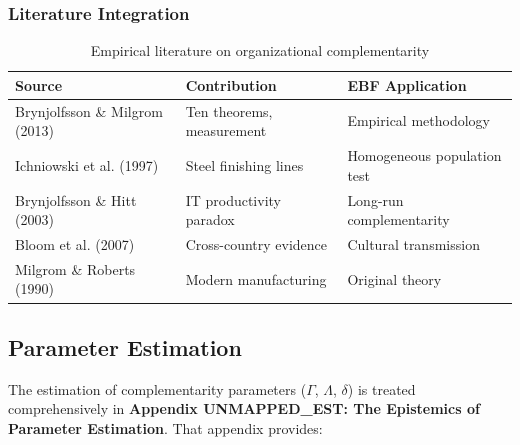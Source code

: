 \subsubsection{Literature Integration}

\begin{table}[h]
\centering
\small
\begin{tabular}{p{3.5cm}p{4cm}p{5cm}}
\toprule
\textbf{Source} & \textbf{Contribution} & \textbf{EBF Application} \\
\midrule
Brynjolfsson \& Milgrom (2013) & Ten theorems, measurement & Empirical methodology \\
Ichniowski et al. (1997) & Steel finishing lines & Homogeneous population test \\
Brynjolfsson \& Hitt (2003) & IT productivity paradox & Long-run complementarity \\
Bloom et al. (2007) & Cross-country evidence & Cultural transmission \\
Milgrom \& Roberts (1990) & Modern manufacturing & Original theory \\
\bottomrule
\end{tabular}
\caption{Empirical literature on organizational complementarity}
\label{tab:empirical-lit}
\end{table}







\subsection{Parameter Estimation}
\label{sec:B-estimation-ref}

The estimation of complementarity parameters ($\Gamma$, $\Lambda$, $\delta$) is 
treated comprehensively in \textbf{Appendix UNMAPPED_EST: The Epistemics of Parameter 
Estimation}. That appendix provides:

